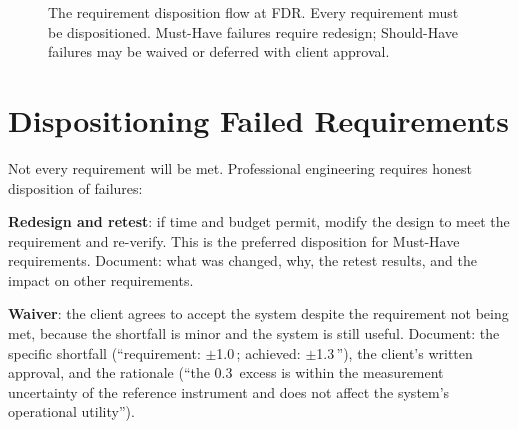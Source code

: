\begin{figure}[htbp]
\centering
{}
\caption{The requirement disposition flow at FDR. Every requirement must be dispositioned. Must-Have failures require redesign; Should-Have failures may be waived or deferred with client approval.}\label{fig:disposition-flow}
\end{figure}


\section{Dispositioning Failed Requirements}
Not every requirement will be met. Professional engineering requires honest disposition of failures:

\textbf{Redesign and retest}: if time and budget permit, modify the design to meet the requirement and re-verify. This is the preferred disposition for Must-Have requirements. Document: what was changed, why, the retest results, and the impact on other requirements.

\textbf{Waiver}: the client agrees to accept the system despite the requirement not being met, because the shortfall is minor and the system is still useful. Document: the specific shortfall (``requirement: $\pm$1.0\,\degC{}; achieved: $\pm$1.3\,\degC{}''), the client's written approval, and the rationale (``the 0.3\,\degC{} excess is within the measurement uncertainty of the reference instrument and does not affect the system's operational utility'').

